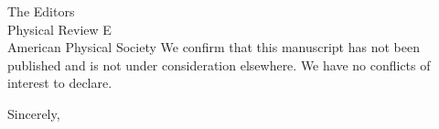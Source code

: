 \documentclass[11pt]{letter}
\begin{document}
\begin{letter}{The Editors\\Physical Review E\\American Physical Society}
We confirm that this manuscript has not been published and is not under consideration elsewhere. We have no conflicts of interest to declare.

\closing{Sincerely,}

\end{letter}
\end{document}
